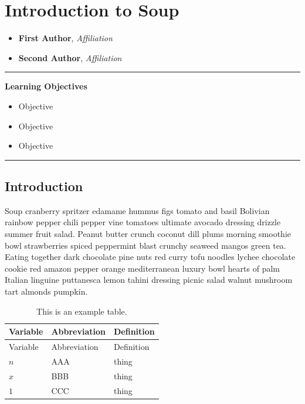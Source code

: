 \documentclass[
  11pt,
,
onecolumn,
openany
]{book}
\providecommand{\tightlist}{%
  \setlength{\itemsep}{0pt}\setlength{\parskip}{0pt}}
\begin{document}
\hypertarget{introduction-to-soup}{%
\chapter{Introduction to Soup}\label{introduction-to-soup}}

\begin{itemize}
\tightlist
\item
  \textbf{First Author}, \emph{Affiliation}
\item
  \textbf{Second Author}, \emph{Affiliation}
\end{itemize}

\begin{center}\rule{0.5\linewidth}{0.5pt}\end{center}

\textbf{Learning Objectives}

\begin{itemize}
\tightlist
\item
  Objective
\item
  Objective
\item
  Objective
\end{itemize}

\begin{center}\rule{0.5\linewidth}{0.5pt}\end{center}

\hypertarget{introduction}{%
\section{Introduction}\label{introduction}}

Soup cranberry spritzer edamame hummus figs tomato and basil Bolivian rainbow
pepper chili pepper vine tomatoes ultimate avocado dressing drizzle summer
fruit salad. Peanut butter crunch coconut dill plums morning smoothie bowl
strawberries spiced peppermint blast crunchy seaweed mangos green tea. Eating
together dark chocolate pine nuts red curry tofu noodles lychee chocolate
cookie red amazon pepper orange mediterranean luxury bowl hearts of palm
Italian linguine puttanesca lemon tahini dressing picnic salad walnut mushroom
tart almonds pumpkin.

\hypertarget{tbl:variables}{}
\begin{longtable}[]{@{}lll@{}}
\caption{\label{tbl:variables}This is an example table.}\tabularnewline
\toprule
Variable & Abbreviation & Definition \\
\midrule
\endfirsthead
\toprule
Variable & Abbreviation & Definition \\
\midrule
\endhead
\(n\) & AAA & thing \\
\(x\) & BBB & thing \\
\(1\) & CCC & thing \\
\bottomrule
\end{longtable}
\end{document}
